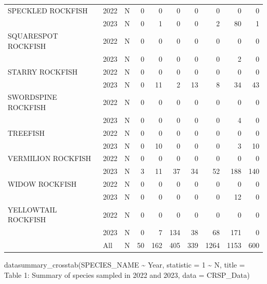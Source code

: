 \documentclass[
  letterpaper,
  DIV=11,
  numbers=noendperiod]{scrartcl}
\newenvironment{Shaded}{\begin{snugshade}}{\end{snugshade}}
\newcommand{\AttributeTok}[1]{\textcolor[rgb]{0.40,0.45,0.13}{#1}}
\newcommand{\DecValTok}[1]{\textcolor[rgb]{0.68,0.00,0.00}{#1}}
\newcommand{\FunctionTok}[1]{\textcolor[rgb]{0.28,0.35,0.67}{#1}}
\newcommand{\NormalTok}[1]{\textcolor[rgb]{0.00,0.23,0.31}{#1}}
\newcommand{\SpecialCharTok}[1]{\textcolor[rgb]{0.37,0.37,0.37}{#1}}
\newcommand{\StringTok}[1]{\textcolor[rgb]{0.13,0.47,0.30}{#1}}
\begin{document}
\begin{table}
\begin{tabular}[t]{lllrrrrrrr}
SPECKLED ROCKFISH & 2022 & N & 0 & 0 & 0 & 0 & 0 & 0 & 0\\
 & 2023 & N & 0 & 1 & 0 & 0 & 2 & 80 & 1\\
SQUARESPOT ROCKFISH & 2022 & N & 0 & 0 & 0 & 0 & 0 & 0 & 0\\
 & 2023 & N & 0 & 0 & 0 & 0 & 0 & 2 & 0\\
STARRY ROCKFISH & 2022 & N & 0 & 0 & 0 & 0 & 0 & 0 & 0\\
 & 2023 & N & 0 & 11 & 2 & 13 & 8 & 34 & 43\\
SWORDSPINE ROCKFISH & 2022 & N & 0 & 0 & 0 & 0 & 0 & 0 & 0\\
 & 2023 & N & 0 & 0 & 0 & 0 & 0 & 4 & 0\\
TREEFISH & 2022 & N & 0 & 0 & 0 & 0 & 0 & 0 & 0\\
 & 2023 & N & 0 & 10 & 0 & 0 & 0 & 3 & 10\\
VERMILION ROCKFISH & 2022 & N & 0 & 0 & 0 & 0 & 0 & 0 & 0\\
 & 2023 & N & 3 & 11 & 37 & 34 & 52 & 188 & 140\\
WIDOW ROCKFISH & 2022 & N & 0 & 0 & 0 & 0 & 0 & 0 & 0\\
 & 2023 & N & 0 & 0 & 0 & 0 & 0 & 12 & 0\\
YELLOWTAIL ROCKFISH & 2022 & N & 0 & 0 & 0 & 0 & 0 & 0 & 0\\
 & 2023 & N & 0 & 7 & 134 & 38 & 68 & 171 & 0\\
 & All & N & 50 & 162 & 405 & 339 & 1264 & 1153 & 600\\
\bottomrule
\end{tabular}
\end{table}

\begin{Shaded}
\begin{Highlighting}[]
\FunctionTok{datasummary\_crosstab}\NormalTok{(SPECIES\_NAME }\SpecialCharTok{\textasciitilde{}}\NormalTok{ Year, }\AttributeTok{statistic =} \DecValTok{1} \SpecialCharTok{\textasciitilde{}}\NormalTok{ N, }\AttributeTok{title =} \StringTok{\textquotesingle{}Table 1: Summary of species sampled in 2022 and 2023\textquotesingle{}}\NormalTok{, }\AttributeTok{data =}\NormalTok{ CRSP\_Data)}
\end{Highlighting}
\end{Shaded}
\end{document}
